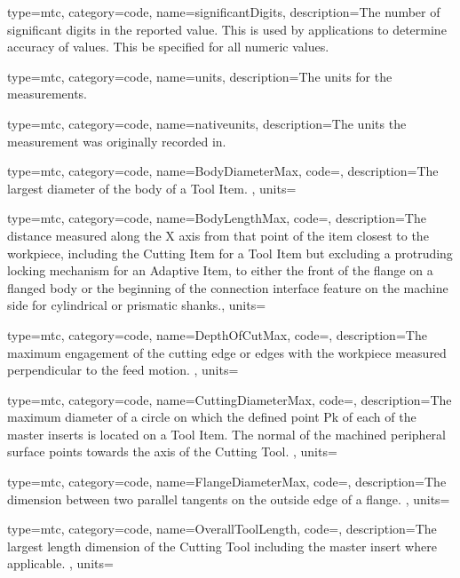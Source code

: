 {
  type=mtc,
  category=code,
  name={significantDigits},
  description={The number of significant digits in the reported value. This is used by applications to determine accuracy of values. This \MAY be specified for all numeric values.}
}


{
  type=mtc,
  category=code,
  name={units},
  description={The units for the measurements. }
}


{
  type=mtc,
  category=code,
  name={nativeunits},
  description={The units the measurement was originally recorded in. }
}


{
  type=mtc,
  category=code,
  name={BodyDiameterMax},
  code=,
  description={The largest diameter of the body of a Tool Item. },
  units=
}


{
  type=mtc,
  category=code,
  name={BodyLengthMax},
  code=,
  description={The distance measured along the X axis from that point of the item closest to the workpiece, including the Cutting Item for a Tool Item but excluding a protruding locking mechanism for an Adaptive Item, to either the front of the flange on a flanged body or the beginning of the connection interface feature on the machine side for cylindrical or prismatic shanks.},
  units=
}


{
  type=mtc,
  category=code,
  name={DepthOfCutMax},
  code=,
  description={The maximum engagement of the cutting edge or edges with the workpiece measured perpendicular to the feed motion. },
  units=
}


{
  type=mtc,
  category=code,
  name={CuttingDiameterMax},
  code=,
  description={The maximum diameter of a circle on which the defined point Pk of each of the master inserts is located on a Tool Item. The normal of the machined peripheral surface points towards the axis of the Cutting Tool. },
  units=
}


{
  type=mtc,
  category=code,
  name={FlangeDiameterMax},
  code=,
  description={The dimension between two parallel tangents on the outside edge of a flange. },
  units=
}


{
  type=mtc,
  category=code,
  name={OverallToolLength},
  code=,
  description={The largest length dimension of the Cutting Tool including the master insert where applicable.  },
  units=
}


